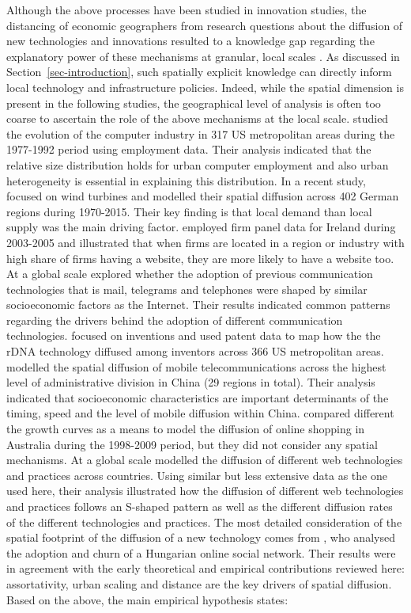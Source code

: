 \documentclass[
  authoryear,
  preprint,
  3p]{elsarticle}
\begin{document}
Although the above processes have been studied in innovation studies,
the distancing of economic geographers from research questions about the
diffusion of new technologies and innovations resulted to a knowledge
gap regarding the explanatory power of these mechanisms at granular,
local scales \citep{ding2010modeling}. As discussed in
Section~\ref{sec-introduction}, such spatially explicit knowledge can
directly inform local technology and infrastructure policies. Indeed,
while the spatial dimension is present in the following studies, the
geographical level of analysis is often too coarse to ascertain the role
of the above mechanisms at the local scale. \citet{beardsell1999spatial}
studied the evolution of the computer industry in 317 US metropolitan
areas during the 1977-1992 period using employment data. Their analysis
indicated that the relative size distribution holds for urban computer
employment and also urban heterogeneity is essential in explaining this
distribution. In a recent study, \citet{bednarz2020pulled} focused on
wind turbines and modelled their spatial diffusion across 402 German
regions during 1970-2015. Their key finding is that local demand than
local supply was the main driving factor. \citet{haller2011determinants}
employed firm panel data for Ireland during 2003-2005 and illustrated
that when firms are located in a region or industry with high share of
firms having a website, they are more likely to have a website too. At a
global scale \citet{perkins2011internet} explored whether the adoption
of previous communication technologies that is mail, telegrams and
telephones were shaped by similar socioeconomic factors as the Internet.
Their results indicated common patterns regarding the drivers behind the
adoption of different communication technologies.
\citet{feldman2015rknowledge} focused on inventions and used patent data
to map how the the rDNA technology diffused among inventors across 366
US metropolitan areas. \citet{ding2010modeling} modelled the spatial
diffusion of mobile telecommunications across the highest level of
administrative division in China (29 regions in total). Their analysis
indicated that socioeconomic characteristics are important determinants
of the timing, speed and the level of mobile diffusion within China.
\citet{bakher2013diffusion} compared different the growth curves as a
means to model the diffusion of online shopping in Australia during the
1998-2009 period, but they did not consider any spatial mechanisms. At a
global scale \citet{PAPAGIANNIDIS2015308} modelled the diffusion of
different web technologies and practices across countries. Using similar
but less extensive data as the one used here, their analysis illustrated
how the diffusion of different web technologies and practices follows an
S-shaped pattern as well as the different diffusion rates of the
different technologies and practices. The most detailed consideration of
the spatial footprint of the diffusion of a new technology comes from
\citet{lengyel2020role}, who analysed the adoption and churn of a
Hungarian online social network. Their results were in agreement with
the early theoretical and empirical contributions reviewed here:
assortativity, urban scaling and distance are the key drivers of spatial
diffusion. Based on the above, the main empirical hypothesis states:
\end{document}

